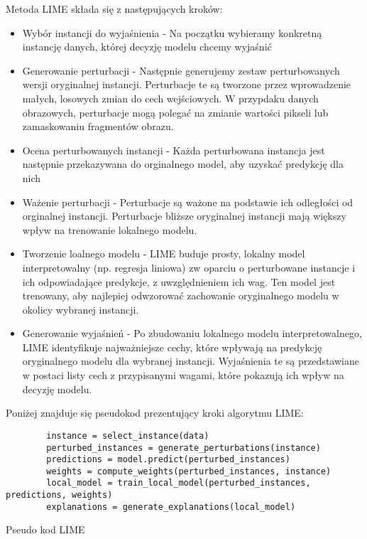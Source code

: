 Metoda LIME składa się z następujących kroków:
\begin{itemize}
	\item Wybór instancji do wyjaśnienia - Na początku wybieramy konkretną instancję danych, której decyzję modelu chcemy wyjaśnić
	\item Generowanie perturbacji - Następnie generujemy zestaw perturbowanych wersji oryginalnej instancji.
	      Perturbacje te są tworzone przez wprowadzenie małych, losowych zmian do cech wejściowych.
	      W przypdaku danych obrazowych, perturbacje mogą polegać na zmianie wartości pikseli lub zamaskowaniu fragmentów obrazu.
	\item Ocena perturbowanych instancji - Każda perturbowana instancja jest następnie przekazywana do orginalnego model, aby uzyskać predykcję dla nich
	\item Ważenie perturbacji - Perturbacje są ważone na podstawie ich odległości od orginalnej instancji.
	      Perturbacje bliższe oryginalnej instancji mają większy wpływ na trenowanie lokalnego modelu.
	\item Tworzenie loalnego modelu - LIME buduje prosty, lokalny model interpretowalny (np. regresja liniowa) zw oparciu o perturbowane instancje i ich odpowiadające predykcje, z uwzględnieniem ich wag.
	      Ten model jest trenowany, aby najlepiej odwzorować zachowanie oryginalnego modelu w okolicy wybranej instancji.
	\item Generowanie wyjaśnień - Po zbudowaniu lokalnego modelu interpretowalnego, LIME identyfikuje najważniejsze cechy, które wpływają na predykcję oryginalnego modelu dla wybranej instancji.
	      Wyjaśnienia te są przedstawiane w postaci listy cech z przypisanymi wagami, które pokazują ich wpływ na decyzję modelu.
\end{itemize}

Poniżej znajduje się pseudokod prezentujący kroki algorytmu LIME:
\begin{listing}
	\begin{verbatim}
        instance = select_instance(data)
        perturbed_instances = generate_perturbations(instance)
        predictions = model.predict(perturbed_instances)
        weights = compute_weights(perturbed_instances, instance)
        local_model = train_local_model(perturbed_instances, predictions, weights)
        explanations = generate_explanations(local_model)
  \end{verbatim}
	\caption{Pseudo kod LIME} \label{listing:lime}
\end{listing}

